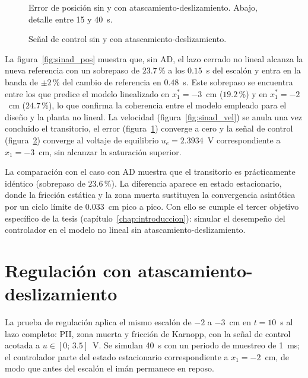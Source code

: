 \begin{figure}[ht]
    \centering
    
    \caption[Sin AD: error]{Error de posición sin y con atascamiento-deslizamiento. Abajo, detalle entre 15 y 40~s.}
    \label{fig:sinad_error}
\end{figure}

\begin{figure}[ht]
    \centering
    
    \caption[Sin AD: señal de control]{Señal de control sin y con atascamiento-deslizamiento.}
    \label{fig:sinad_ctrl}
\end{figure}

La figura~\ref{fig:sinad_pos} muestra que, sin AD, el lazo cerrado no lineal alcanza la nueva referencia con un sobrepaso de $23.7$\,\% a los $0.15$~s del escalón y entra en la banda de $\pm 2$\,\% del cambio de referencia en $0.48$~s. Este sobrepaso se encuentra entre los que predice el modelo linealizado en $x_1^*=-3$~cm ($19.2$\,\%) y en $x_1^*=-2$~cm ($24.7$\,\%), lo que confirma la coherencia entre el modelo empleado para el diseño y la planta no lineal. La velocidad (figura~\ref{fig:sinad_vel}) se anula una vez concluido el transitorio, el error (figura~\ref{fig:sinad_error}) converge a cero y la señal de control (figura~\ref{fig:sinad_ctrl}) converge al voltaje de equilibrio $u_e=2.3934$~V correspondiente a $x_1=-3$~cm, sin alcanzar la saturación superior.

La comparación con el caso con AD muestra que el transitorio es prácticamente idéntico (sobrepaso de $23.6$\,\%). La diferencia aparece en estado estacionario, donde la fricción estática y la zona muerta sustituyen la convergencia asintótica por un ciclo límite de $0.033$~cm pico a pico. Con ello se cumple el tercer objetivo específico de la tesis (capítulo~\ref{chap:introduccion}): simular el desempeño del controlador en el modelo no lineal sin atascamiento-deslizamiento.

\FloatBarrier

\section{Regulación con atascamiento-deslizamiento}
\label{sec:regulacion}

La prueba de regulación aplica el mismo escalón de $-2$ a $-3$~cm en $t=10$~s al lazo completo: PII, zona muerta y fricción de Karnopp, con la señal de control acotada a $u\in[0;\,3.5]$~V. Se simulan 40~s con un periodo de muestreo de 1~ms; el controlador parte del estado estacionario correspondiente a $x_1=-2$~cm, de modo que antes del escalón el imán permanece en reposo.

